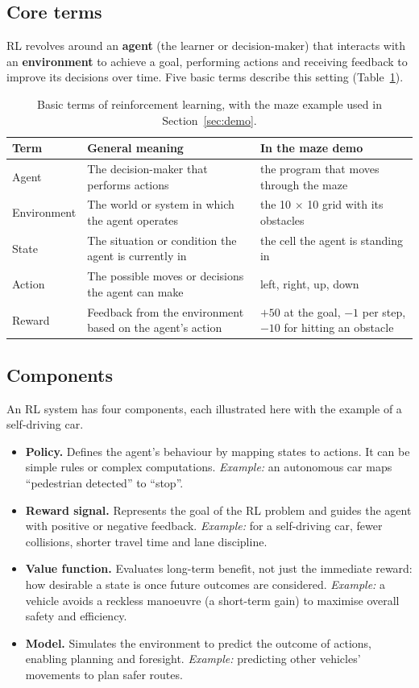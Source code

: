 \documentclass[11pt, a4paper]{article}
\begin{document}
\subsection{Core terms}

RL revolves around an \textbf{agent} (the learner or decision-maker) that interacts with an \textbf{environment} to achieve a goal, performing actions and receiving feedback to improve its decisions over time. Five basic terms describe this setting (Table~\ref{tab:rlterms}).

\begin{table}[H]
\centering
\small
\caption{Basic terms of reinforcement learning, with the maze example used in Section~\ref{sec:demo}.}
\label{tab:rlterms}
\begin{tabularx}{\textwidth}{l X X}
\toprule
Term & General meaning & In the maze demo \\
\midrule
Agent & The decision-maker that performs actions & the program that moves through the maze \\
Environment & The world or system in which the agent operates & the 10 $\times$ 10 grid with its obstacles \\
State & The situation or condition the agent is currently in & the cell the agent is standing in \\
Action & The possible moves or decisions the agent can make & left, right, up, down \\
Reward & Feedback from the environment based on the agent's action & $+50$ at the goal, $-1$ per step, $-10$ for hitting an obstacle \\
\bottomrule
\end{tabularx}
\end{table}

\subsection{Components}

An RL system has four components, each illustrated here with the example of a self-driving car.

\begin{itemize}
    \item \textbf{Policy.} Defines the agent's behaviour by mapping states to actions. It can be simple rules or complex computations. \emph{Example:} an autonomous car maps ``pedestrian detected'' to ``stop''.
    \item \textbf{Reward signal.} Represents the goal of the RL problem and guides the agent with positive or negative feedback. \emph{Example:} for a self-driving car, fewer collisions, shorter travel time and lane discipline.
    \item \textbf{Value function.} Evaluates long-term benefit, not just the immediate reward: how desirable a state is once future outcomes are considered. \emph{Example:} a vehicle avoids a reckless manoeuvre (a short-term gain) to maximise overall safety and efficiency.
    \item \textbf{Model.} Simulates the environment to predict the outcome of actions, enabling planning and foresight. \emph{Example:} predicting other vehicles' movements to plan safer routes.
\end{itemize}
\end{document}
